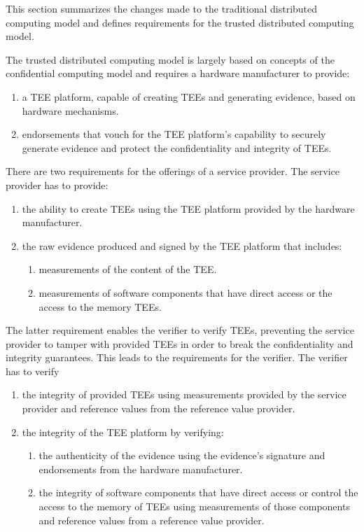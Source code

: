 This section summarizes the changes made to the traditional distributed
computing model and defines requirements for the trusted distributed computing
model.

The trusted distributed computing model is largely based on concepts of the
confidential computing model and requires a hardware manufacturer to provide:

\begin{enumerate}[label*=R\arabic*]
  \item a TEE platform, capable of creating TEEs and generating evidence, based
        on hardware mechanisms.
  \item endorsements that vouch for the TEE platform's capability to securely
        generate evidence and protect the confidentiality and integrity of TEEs.
\end{enumerate}

There are two requirements for the offerings of a service provider. The service
provider has to provide:

\begin{enumerate}[resume,label*=R\arabic*]
  \item the ability to create TEEs using the TEE platform provided by the hardware
        manufacturer.
  \item the raw evidence produced and signed by the TEE platform that includes:
        \begin{enumerate}[label*=.\arabic*]
          \item measurements of the content of the TEE.
          \item measurements of software components that have direct access or
                the access to the memory TEEs.
        \end{enumerate}
\end{enumerate}

The latter requirement enables the verifier to verify TEEs, preventing the
service provider to tamper with provided TEEs in order to break the
confidentiality and integrity guarantees. This leads to the requirements for the
verifier. The verifier has to verify

\begin{enumerate}[resume,label*=R\arabic*]
  \item the integrity of provided TEEs using measurements provided by the
        service provider and reference values from the reference value provider.
  \item the integrity of the TEE platform by verifying:
        \begin{enumerate}[label*=.\arabic*]
          \item the authenticity of the evidence using the evidence's signature
                and endorsements from the hardware manufacturer.
          \item the integrity of software components that have direct access or
                control the access to the memory of TEEs using measurements of
                those components and reference values from a reference value
                provider.
        \end{enumerate}
\end{enumerate}

